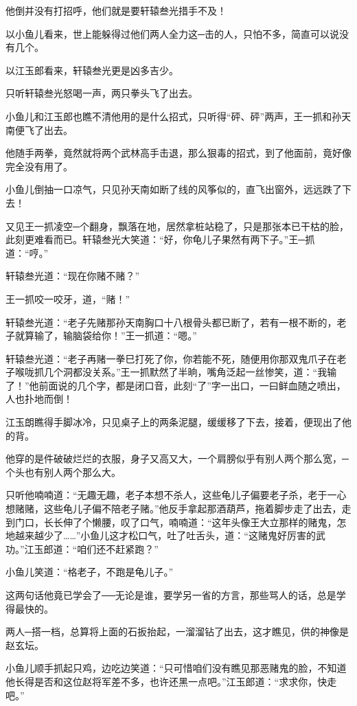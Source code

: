 \documentclass[12pt,oneside]{book}
\begin{document}
他倒并没有打招呼，他们就是要轩辕叁光措手不及！

以小鱼儿看来，世上能躲得过他们两人全力这─击的人，只怕不多，简直可以说没有几个。

以江玉郎看来，轩辕叁光更是凶多吉少。

只听轩辕叁光怒喝一声，两只拳头飞了出去。

小鱼儿和江玉郎也瞧不清他用的是什么招式，只听得``砰、砰''两声，王一抓和孙天南便飞了出去。

他随手两拳，竟然就将两个武林高手击退，那么狠毒的招式，到了他面前，竟好像完全没有用了。

小鱼儿倒抽一口凉气，只见孙天南如断了线的风筝似的，直飞出窗外，远远跌了下去！

又见王一抓凌空─个翻身，飘落在地，居然拿桩站稳了，只是那张本已干枯的脸，此刻更难看而已。轩辕叁光大笑道：``好，你龟儿子果然有两下子。''王─抓道：``哼。''

轩辕叁光道：``现在你赌不赌？''

王一抓咬一咬牙，道，``赌！''

轩辕叁光道：``老子先赌那孙天南胸口十八根骨头都已断了，若有一根不断的，老子就算输了，输脑袋给你！''王一抓道：``嗯。''

轩辕叁光道：``老子再赌一拳巳打死了你，你若能不死，随便用你那双鬼爪子在老子喉咙抓几个洞都没关系。''王一抓默然了半晌，嘴角泛起一丝惨笑，道：``我输了！''他前面说的几个字，都是闭口音，此刻``了''字一出口，一曰鲜血随之喷出，人也扑地而倒！

江玉朗瞧得手脚冰冷，只见桌子上的两条泥腿，缓缓移了下去，接着，便现出了他的背。

他穿的是件破破烂烂的衣服，身子又高又大，一个肩膀似乎有别人两个那么宽，─个头也有别人两个那么大。

只听他喃喃道：``无趣无趣，老子本想不杀人，这些龟儿子偏要老子杀，老于一心想赌赌，这些龟儿子偏不陪老子赌。''他反手拿起那酒葫芦，拖着脚步走了出去，走到门口，长长伸了个懒腰，叹了口气，喃喃道：``这年头像王大立那样的赌鬼，怎地越来越少了\ldots\ldots{}''小鱼儿这才松口气，吐了吐舌头，道：``这赌鬼好厉害的武功。''江玉郎道：``咱们还不赶紧跑？''

小鱼儿笑道：``格老子，不跑是龟儿子。''

这两句话他竟已学会了──无论是谁，要学另一省的方言，那些骂人的话，总是学得最快的。

两人─搭一档，总算将上面的石扳抬起，一溜溜钻了出去，这才瞧见，供的神像是赵玄坛。

小鱼儿顺手抓起只鸡，边吃边笑道：``只可惜咱们没有瞧见那恶赌鬼的脸，不知道他长得是否和这位赵将军差不多，也许还黑一点吧。''江玉郎道：``求求你，快走吧。''
\end{document}
